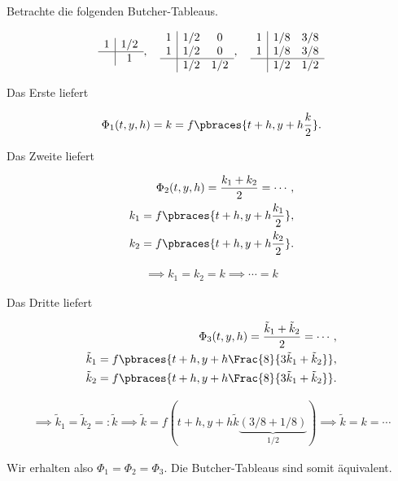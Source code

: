 \begin{example*}

Betrachte die folgenden Butcher-Tableaus.

\begin{align*}
  \begin{array}{c|c}
    1 & 1/2 \\
    \hline
      & 1
  \end{array},
  \quad
  \begin{array}{c|c c}
    1 & 1/2 & 0 \\
    1 & 1/2 & 0 \\
    \hline
      & 1/2 & 1/2
  \end{array},
  \quad
  \begin{array}{c|c c}
    1 & 1/8 & 3/8 \\
    1 & 1/8 & 3/8 \\
    \hline
      & 1/2 & 1/2
  \end{array}
\end{align*}

Das Erste liefert

\begin{align*}
  \Phi_1(t, y, h)
  =
  k
  =
  f \pbraces{t + h, y + h \frac{k}{2}}.
\end{align*}

Das Zweite liefert

\begin{align*}
  \Phi_2(t, y, h)
  =
  \frac{k_1 + k_2}{2}
  =
  \cdots, \\
  k_1 = f \pbraces{t + h, y + h \frac{k_1}{2}}, \\
  k_2 = f \pbraces{t + h, y + h \frac{k_2}{2}}.
\end{align*}

\begin{align*}
  \implies
  k_1 = k_2 = k
  \implies
  \cdots
  =
  k
\end{align*}

Das Dritte liefert

\begin{align*}
  \Phi_3(t, y, h)
  =
  \frac{\tilde{k}_1 + \tilde{k}_2}{2}
  =
  \cdots, \\
  \tilde{k}_1
  =
  f \pbraces
  {
    t + h,
    y + h \Frac{8}{3 \tilde{k}_1 + \tilde{k}_2}
  }, \\
  \tilde{k}_2
  =
  f \pbraces
  {
    t + h,
    y + h \Frac{8}{3 \tilde{k}_1 + \tilde{k}_2}
  }.
\end{align*}

\begin{align*}
  \implies
  \tilde{k}_1 = \tilde{k}_2 =: \tilde{k}
  \implies
  \tilde{k}
  =
  f (
    t + h,
    y + h \tilde{k} \underbrace{(3/8 + 1/8)}_{1/2}
  )
  \implies
  \tilde{k} = k = \cdots
\end{align*}

Wir erhalten also $\Phi_1 = \Phi_2 = \Phi_3$.
Die Butcher-Tableaus sind somit äquivalent.

\end{example*}
